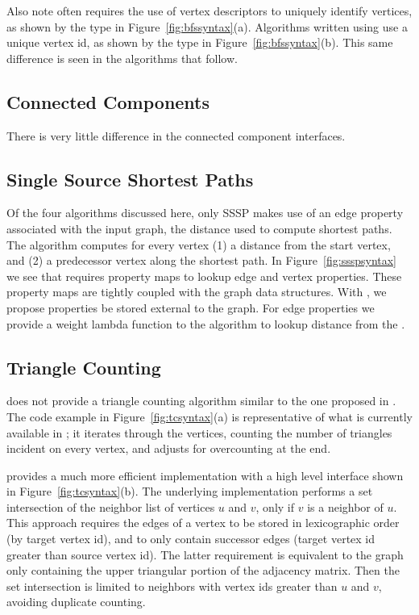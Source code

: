 Also note \bgl often requires the use of vertex descriptors to uniquely
identify vertices, as shown by the 
type in Figure~\ref{fig:bfssyntax}(a).
Algorithms written using \stdgraph use a unique vertex id, as shown by the
 type in Figure~\ref{fig:bfssyntax}(b).
This same difference is seen in the algorithms that follow.

\subsection{Connected Components}
There is very little difference in the connected component interfaces.


\subsection{Single Source Shortest Paths}
Of the four algorithms discussed here, only SSSP makes use of an
edge property associated with the input graph, the distance used
to compute shortest paths.
The algorithm computes for
every vertex (1) a distance from the start vertex, and (2) a predecessor
vertex along the shortest path.
In Figure~\ref{fig:ssspsyntax} we see that \bgl requires
property maps to lookup edge and vertex properties.
These property maps are tightly coupled with the graph data structures.
With \stdgraph, we propose properties be stored external to the graph.
For edge properties we provide a weight lambda function to the algorithm
to lookup distance from the .

\subsection{Triangle Counting}
\bgl does not provide a triangle counting algorithm
similar to the one proposed in \stdgraph.
The code example in Figure~\ref{fig:tcsyntax}(a) is representative of what is
currently available in \bgl; it iterates through the vertices,
counting the number of triangles
incident on every vertex, and adjusts for overcounting at the end.

\stdgraph provides a much more efficient implementation with a high level
interface shown in Figure~\ref{fig:tcsyntax}(b).
The underlying \stdgraph implementation performs a set intersection
of the neighbor list of vertices $u$ and $v$, only if $v$ is a neighbor of $u$.
This approach  requires the edges of a vertex to be stored
in lexicographic order (by target vertex id), and to only contain successor
edges (target vertex id greater than source vertex id). The latter
requirement is equivalent to the graph only containing the upper triangular
portion of the adjacency matrix.
Then the set intersection is limited to neighbors with vertex ids greater
than $u$ and $v$, avoiding duplicate counting.

